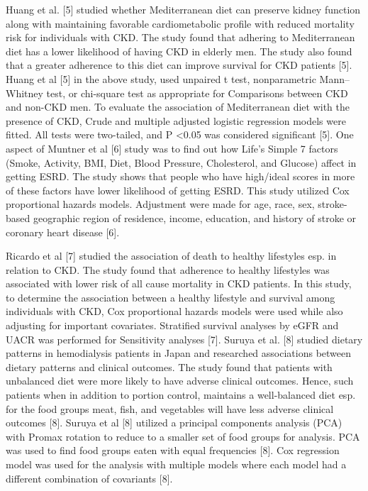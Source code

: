 \medskip
\noindent Huang et al. [5] studied whether Mediterranean diet can preserve kidney function along with maintaining favorable cardiometabolic profile with reduced mortality risk for individuals with CKD. The study found that adhering to Mediterranean diet has a lower likelihood of having CKD in elderly men. The study also found that a greater adherence to this diet can improve survival for CKD patients [5]. Huang et al [5] in the above study, used unpaired t test, nonparametric Mann–Whitney test, or chi-square test as appropriate for Comparisons between CKD and non-CKD men. To evaluate the association of Mediterranean diet with the presence of CKD, Crude and multiple adjusted logistic regression models were fitted. All tests were two-tailed, and P \textless 0.05 was considered significant [5]. One aspect of Muntner et al [6] study was to find out how Life’s Simple 7 factors (Smoke, Activity, BMI, Diet, Blood Pressure, Cholesterol, and Glucose) affect in getting ESRD. The study shows that people who have high/ideal scores in more of these factors have lower likelihood of getting ESRD. This study utilized Cox proportional hazards models. Adjustment were made for age, race, sex, stroke-based geographic region of residence, income, education, and history of stroke or coronary heart disease [6].


\medskip
\noindent  Ricardo et al [7] studied the association of death to healthy lifestyles esp. in relation to CKD. The study found that adherence to healthy lifestyles was associated with lower risk of all cause mortality in CKD patients. In this study, to determine the association between a healthy lifestyle and survival among individuals with CKD, Cox proportional hazards models were used while also adjusting for important covariates. Stratified survival analyses by eGFR and UACR was performed for Sensitivity analyses [7]. Suruya et al. [8] studied dietary patterns in hemodialysis patients in Japan and researched associations between dietary patterns and clinical outcomes. The study found that patients with unbalanced diet were more likely to have adverse clinical outcomes. Hence, such patients when in addition to portion control, maintains a well-balanced diet esp. for the food groups meat, fish, and vegetables will have less adverse clinical outcomes [8]. Suruya et al [8] utilized a principal components analysis (PCA) with Promax rotation to reduce to a smaller set of food groups for analysis. PCA was used to find food groups eaten with equal frequencies [8]. Cox regression model was used for the analysis with multiple models where each model had a different combination of covariants [8].

